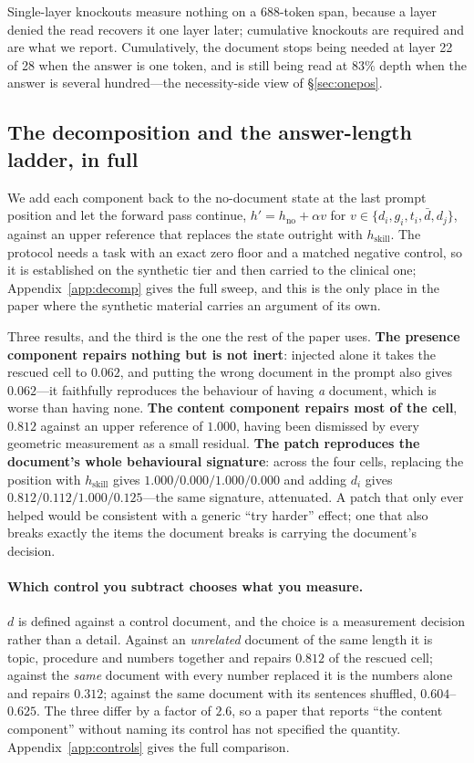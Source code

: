 \documentclass{article}
\newcommand{\dvec}{\ensuremath{d}}
\newcommand{\gvec}{\ensuremath{g}}
\newcommand{\tvec}{\ensuremath{t}}
\begin{document}
Single-layer knockouts measure nothing on a 688-token span, because a layer
denied the read recovers it one layer later; cumulative knockouts are required
and are what we report. Cumulatively, the document stops being needed at layer
22 of 28 when the answer is one token, and is still being read at $83\%$ depth
when the answer is several hundred---the necessity-side view of
\S\ref{sec:onepos}.




\subsection{The decomposition and the answer-length ladder, in full}
\label{app:onepos}

We add each component back to the no-document state at the last prompt position
and let the forward pass continue, $h' = h_{\text{no}} + \alpha v$ for
$v \in \{\dvec_i, \gvec_i, \tvec_i, \bar{\dvec}, \dvec_j\}$, against an upper
reference that replaces the state outright with $h_{\text{skill}}$. The
protocol needs a task with an exact zero floor and a matched negative control,
so it is established on the synthetic tier and then carried to the clinical one;
Appendix~\ref{app:decomp} gives the full sweep, and this is the only place in
the paper where the synthetic material carries an argument of its own.

Three results, and the third is the one the rest of the paper uses.
\textbf{The presence component repairs nothing but is not inert}: injected
alone it takes the rescued cell to $0.062$, and putting the wrong document in
the prompt also gives $0.062$---it faithfully reproduces the behaviour of having
\emph{a} document, which is worse than having none. \textbf{The content
component repairs most of the cell}, $0.812$ against an upper reference of
$1.000$, having been dismissed by every geometric measurement as a small
residual. \textbf{The patch reproduces the document's whole behavioural
signature}: across the four cells, replacing the position with
$h_{\text{skill}}$ gives $1.000 / 0.000 / 1.000 / 0.000$ and adding $\dvec_i$
gives $0.812 / 0.112 / 1.000 / 0.125$---the same signature, attenuated. A patch
that only ever helped would be consistent with a generic ``try harder'' effect;
one that also breaks exactly the items the document breaks is carrying the
document's decision.

\paragraph{Which control you subtract chooses what you measure.} $\dvec$ is
defined against a control document, and the choice is a measurement decision
rather than a detail. Against an \emph{unrelated} document of the same length it
is topic, procedure and numbers together and repairs $0.812$ of the rescued
cell; against the \emph{same} document with every number replaced it is the
numbers alone and repairs $0.312$; against the same document with its sentences
shuffled, $0.604$--$0.625$. The three differ by a factor of $2.6$, so a paper
that reports ``the content component'' without naming its control has not
specified the quantity. Appendix~\ref{app:controls} gives the full comparison.
\end{document}

